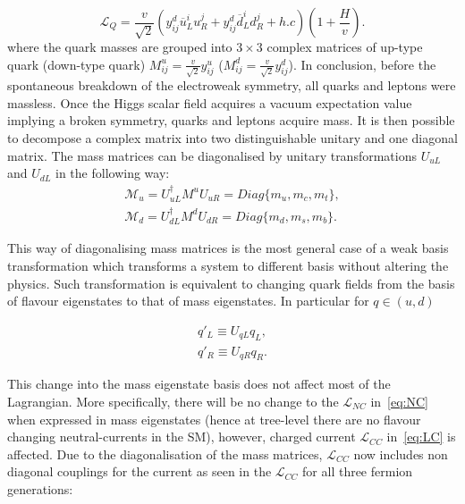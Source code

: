 \begin{equation}
	\mathcal{L}_{Q}=\frac{v}{\sqrt{2}}(y^{d}_{ij}\overline{u}^{i}_{L} u^{j}_{R} + {y}_{ij}^{d}\overline{d}^{i}_{L} d^{j}_{R} + h.c)(1+\frac{H}{v}).
	\label{eq:SSB4}
\end{equation}
where the quark masses are grouped into $3\times3$ complex matrices of up-type quark (down-type quark) $M^{u}_{ij}=\frac{v}{\sqrt{2}}y_{ij}^{u}$ ($M^{d}_{ij}=\frac{v}{\sqrt{2}}y_{ij}^{d}$).
In conclusion, before the spontaneous breakdown of the electroweak symmetry, all quarks and leptons were massless. Once the Higgs scalar field acquires a vacuum expectation value implying a broken symmetry, quarks and leptons acquire mass. It is then possible to decompose a complex matrix into two distinguishable unitary and one diagonal matrix. The mass matrices can be diagonalised by unitary transformations $U_{uL}$ and $ U_{dL}$ in the following way:
\begin{equation}
\begin{split}
	\mathcal{M}_{u} = U^{\dagger}_{uL}M^{u}U_{uR} = Diag\{m_{u},m_{c},m_{t}\},
\\
	\mathcal{M}_{d} = U^{\dagger}_{dL}M^{d}U_{dR} = Diag\{m_{d},m_{s},m_{b}\}.
\end{split}
	\label{eq:unit}
\end{equation}

This way of diagonalising mass matrices is the most general case of a weak basis transformation which transforms a system to different basis without altering the physics. Such transformation is equivalent to changing quark fields from the basis of flavour eigenstates to that of mass eigenstates.
In particular for $q\in(u,d)$

\begin{equation}
\begin{split}
q'_{L} \equiv U_{qL} q_{L},
\\
q'_{R} \equiv U_{qR} q_{R}.
\end{split}
\end{equation}

This change into the mass eigenstate basis does not affect most of the Lagrangian. More specifically, there will be no change to the $\mathcal{L}_{NC}$ in~\autoref{eq:NC} when expressed in mass eigenstates (hence at tree-level there are no flavour changing neutral-currents in the \gls{SM}), however, charged current $\mathcal{L}_{CC}$ in~\autoref{eq:LC} is affected. Due to the diagonalisation of the mass matrices, $\mathcal{L}_{CC}$ now includes non diagonal couplings for the current as seen in the $\mathcal{L}_{CC}$ for all three fermion generations:

